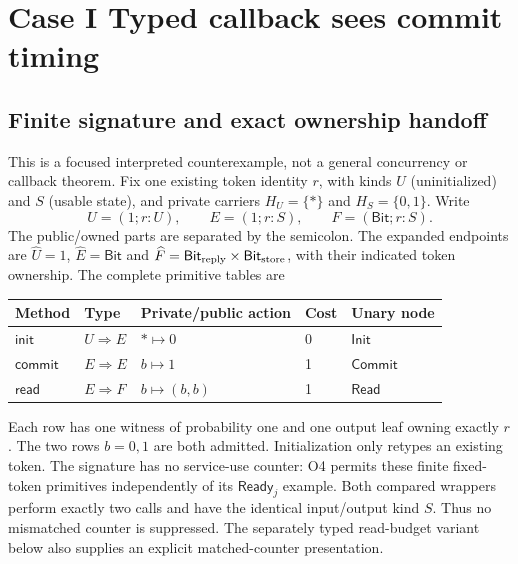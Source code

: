 \section{Case I Typed callback sees commit timing}\label{sec:caseI}

\subsection{Finite signature and exact ownership handoff}
This is a focused interpreted counterexample, not a general concurrency
or callback theorem. Fix one existing token identity $r$, with kinds
$U$ (uninitialized) and $S$ (usable state), and private carriers
$H_U=\{*\}$ and $H_S=\{0,1\}$. Write
\[
U=(1;r:U),\qquad E=(1;r:S),\qquad F=(\mathsf{Bit};r:S).
\]
The public/owned parts are separated by the semicolon. The expanded
endpoints are $\widehat U=1$, $\widehat E=\mathsf{Bit}$ and
$\widehat F=\mathsf{Bit}_{\rm reply}\times\mathsf{Bit}_{\rm store}$,
with their indicated token ownership. The complete primitive tables are
\begin{center}
\begin{tabular}{@{}lllll@{}}
\toprule Method&Type&Private/public action&Cost&Unary node\\\midrule
$\mathsf{init}$&$U\Rightarrow E$&$*\mapsto0$&0&$\mathsf{Init}$\\
$\mathsf{commit}$&$E\Rightarrow E$&$b\mapsto1$&1&$\mathsf{Commit}$\\
$\mathsf{read}$&$E\Rightarrow F$&$b\mapsto(b,b)$&1&$\mathsf{Read}$\\
\bottomrule
\end{tabular}
\end{center}
Each row has one witness of probability one and one output leaf owning
exactly $r$. The two rows $b=0,1$ are both admitted. Initialization only
retypes an existing token. The signature has no service-use counter:
O4 permits these finite fixed-token primitives independently of its
$\mathsf{Ready}_j$ example. Both compared wrappers perform exactly two
calls and have the identical input/output kind $S$. Thus no mismatched
counter is suppressed. The separately typed read-budget variant below
also supplies an explicit matched-counter presentation.

